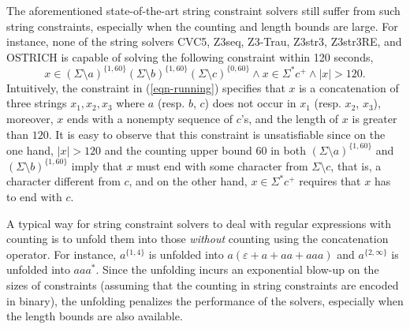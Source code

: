 The aforementioned state-of-the-art string constraint solvers still suffer from such string constraints, especially when the counting and length bounds are large. For instance, none of the string solvers CVC5, Z3seq, Z3-Trau, Z3str3, Z3str3RE, and OSTRICH is capable of solving the following constraint within 120 seconds,
%
\begin{equation}\label{eqn-running}
x \in (\Sigma \setminus a)^{\{1, 60\}} (\Sigma \setminus b)^{\{1, 60\}} (\Sigma \setminus c)^{\{0, 60\}} \wedge x \in \Sigma^* c^+ \wedge |x| > 120.
\end{equation}
Intuitively, the constraint in (\ref{eqn-running}) specifies that $x$ is a concatenation of three strings $x_1, x_2, x_3$ where $a$ (resp. $b$, $c$) does not occur in $x_1$ (resp. $x_2$, $x_3$), moreover, $x$ ends with a nonempty sequence of $c$'s, and the length of $x$ is greater than $120$. It is easy to observe that this constraint is unsatisfiable since on the one hand, $|x| > 120$ and the counting upper bound $60$ in both $(\Sigma \setminus a)^{\{1, 60\}}$ and $(\Sigma \setminus b)^{\{1, 60\}}$ imply that $x$ must end with some character from $\Sigma \setminus c$, that is, a character different from $c$, and on the other hand, $x \in \Sigma^*c^+$ requires that $x$ has to end with $c$.

A typical way for string constraint solvers to deal with regular expressions with counting is to unfold them into those \emph{without} counting using the concatenation operator. For instance, $a^{\{1, 4\}}$ is unfolded into $a(\varepsilon + a + aa + aaa)$ and $a^{\{2,\infty\}}$ is unfolded into $aaa^{*}$. Since the unfolding incurs an exponential blow-up on the sizes of constraints (assuming that the counting in string constraints are encoded in binary), the unfolding penalizes the performance of the solvers, especially when the length bounds are also available.

